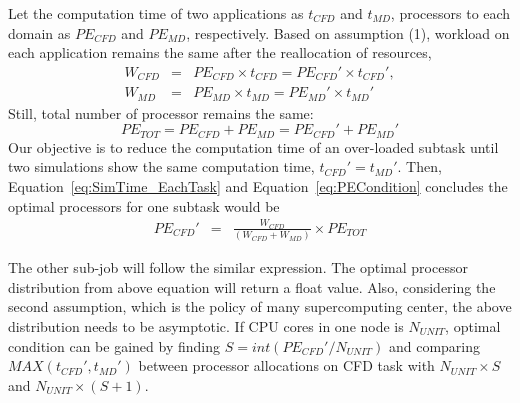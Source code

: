 \documentclass[conference,final]{IEEEtran}
\begin{document}
Let the computation time of two applications as $t_{CFD}$ and $t_{MD}$, processors to each domain as $PE_{CFD}$ and $PE_{MD}$, respectively. Based on assumption (1), workload on each application remains the same after the reallocation of resources,
\begin{eqnarray}
W_{CFD} &=& PE_{CFD} \times t_{CFD} = PE_{CFD}' \times t_{CFD}', \nonumber \\
W_{MD} &=& PE_{MD} \times t_{MD} = PE_{MD}' \times t_{MD}'
\label{eq:SimTime_EachTask}
\end{eqnarray}
Still, total number of processor remains the same:
\begin{equation}
PE_{TOT} = PE_{CFD} + PE_{MD} = PE_{CFD}' + PE_{MD}'
\label{eq:PECondition}
\end{equation}
Our objective is to reduce the computation time of an over-loaded subtask until two simulations show the same computation time, $t_{CFD}' = t_{MD}'$. Then, Equation~\ref{eq:SimTime_EachTask} and Equation~\ref{eq:PECondition} concludes the optimal processors for one subtask would be
\begin{eqnarray}
PE_{CFD}' & = & \frac {W_{CFD}} {(W_{CFD} + W_{MD})} \times PE_{TOT}
\end{eqnarray}

The other sub-job will follow the similar expression. The optimal
processor distribution from above equation will return a float value.
Also, considering the second assumption, which is the policy of many
supercomputing center, the above distribution needs to be asymptotic.
If CPU cores in one node is $N_{UNIT}$,
optimal condition can be gained by finding $S = int(PE_{CFD}' / N_{UNIT})$ and comparing $MAX(t_{CFD}',t_{MD}')$ between processor allocations on CFD task with $N_{UNIT} \times S$ and $N_{UNIT} \times (S+1)$.


\end{document}
